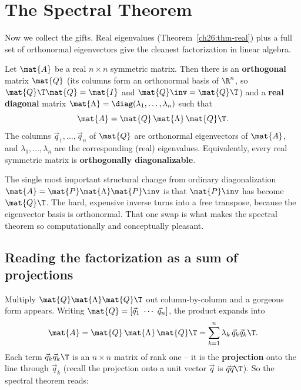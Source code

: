 \section{The Spectral Theorem}
\label{ch26:spectral-theorem}

Now we collect the gifts. Real eigenvalues (Theorem~\ref{ch26:thm-real}) plus a
full set of orthonormal eigenvectors give the cleanest factorization in linear
algebra.

\begin{formalbox}
\begin{theorem}
\label{ch26:thm-spectral}
Let $\mat{A}$ be a real $n\times n$ symmetric matrix. Then there is an
\textbf{orthogonal} matrix $\mat{Q}$ (its columns form an orthonormal basis of
$\R^n$, so $\mat{Q}\T\mat{Q}=\mat{I}$ and $\mat{Q}\inv=\mat{Q}\T$) and a
\textbf{real diagonal} matrix $\mat{\Lambda}=\diag(\lambda_1,\dots,\lambda_n)$
such that
\[
  \mat{A} = \mat{Q}\,\mat{\Lambda}\,\mat{Q}\T.
\]
The columns $\vec{q}_1,\dots,\vec{q}_n$ of $\mat{Q}$ are orthonormal eigenvectors
of $\mat{A}$, and $\lambda_1,\dots,\lambda_n$ are the corresponding (real)
eigenvalues. Equivalently, every real symmetric matrix is \textbf{orthogonally
diagonalizable}.
\end{theorem}
\end{formalbox}

The single most important structural change from ordinary diagonalization
$\mat{A}=\mat{P}\mat{\Lambda}\mat{P}\inv$ is that $\mat{P}\inv$ has become
$\mat{Q}\T$. The hard, expensive inverse turns into a free transpose, because the
eigenvector basis is orthonormal. That one swap is what makes the spectral
theorem so computationally and conceptually pleasant.

\subsection{Reading the factorization as a sum of projections}
\label{ch26:sum-of-projections}

Multiply $\mat{Q}\mat{\Lambda}\mat{Q}\T$ out column-by-column and a gorgeous form
appears. Writing $\mat{Q}=[\vec{q}_1\ \cdots\ \vec{q}_n]$, the product expands into
\[
  \mat{A} = \mat{Q}\,\mat{\Lambda}\,\mat{Q}\T
  = \sum_{k=1}^{n} \lambda_k\,\vec{q}_k\vec{q}_k\T.
\]
Each term $\vec{q}_k\vec{q}_k\T$ is an $n\times n$ matrix of rank one -- it is the
\textbf{projection} onto the line through $\vec{q}_k$ (recall the projection onto a
unit vector $\vec{q}$ is $\vec{q}\vec{q}\T$). So the spectral theorem reads:

